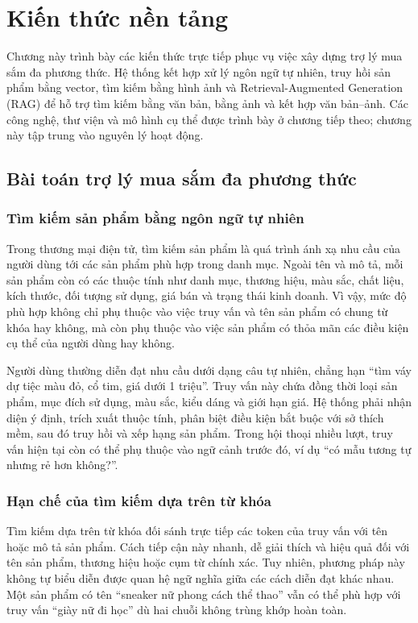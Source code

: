 \section{Kiến thức nền tảng}

Chương này trình bày các kiến thức trực tiếp phục vụ việc xây dựng trợ lý mua sắm đa phương thức. Hệ thống kết hợp xử lý ngôn ngữ tự nhiên, truy hồi sản phẩm bằng vector, tìm kiếm bằng hình ảnh và Retrieval-Augmented Generation (RAG) để hỗ trợ tìm kiếm bằng văn bản, bằng ảnh và kết hợp văn bản--ảnh. Các công nghệ, thư viện và mô hình cụ thể được trình bày ở chương tiếp theo; chương này tập trung vào nguyên lý hoạt động.

\subsection{Bài toán trợ lý mua sắm đa phương thức}

\subsubsection{Tìm kiếm sản phẩm bằng ngôn ngữ tự nhiên}

Trong thương mại điện tử, tìm kiếm sản phẩm là quá trình ánh xạ nhu cầu của người dùng tới các sản phẩm phù hợp trong danh mục. Ngoài tên và mô tả, mỗi sản phẩm còn có các thuộc tính như danh mục, thương hiệu, màu sắc, chất liệu, kích thước, đối tượng sử dụng, giá bán và trạng thái kinh doanh. Vì vậy, mức độ phù hợp không chỉ phụ thuộc vào việc truy vấn và tên sản phẩm có chung từ khóa hay không, mà còn phụ thuộc vào việc sản phẩm có thỏa mãn các điều kiện cụ thể của người dùng hay không.

Người dùng thường diễn đạt nhu cầu dưới dạng câu tự nhiên, chẳng hạn “tìm váy dự tiệc màu đỏ, cổ tim, giá dưới 1 triệu”. Truy vấn này chứa đồng thời loại sản phẩm, mục đích sử dụng, màu sắc, kiểu dáng và giới hạn giá. Hệ thống phải nhận diện ý định, trích xuất thuộc tính, phân biệt điều kiện bắt buộc với sở thích mềm, sau đó truy hồi và xếp hạng sản phẩm. Trong hội thoại nhiều lượt, truy vấn hiện tại còn có thể phụ thuộc vào ngữ cảnh trước đó, ví dụ “có mẫu tương tự nhưng rẻ hơn không?”.

\subsubsection{Hạn chế của tìm kiếm dựa trên từ khóa}

Tìm kiếm dựa trên từ khóa đối sánh trực tiếp các token của truy vấn với tên hoặc mô tả sản phẩm. Cách tiếp cận này nhanh, dễ giải thích và hiệu quả đối với tên sản phẩm, thương hiệu hoặc cụm từ chính xác. Tuy nhiên, phương pháp này không tự biểu diễn được quan hệ ngữ nghĩa giữa các cách diễn đạt khác nhau. Một sản phẩm có tên “sneaker nữ phong cách thể thao” vẫn có thể phù hợp với truy vấn “giày nữ đi học” dù hai chuỗi không trùng khớp hoàn toàn.


